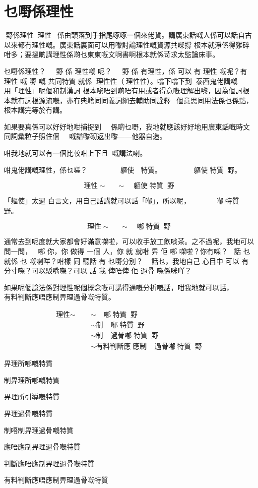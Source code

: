 \chapter{乜嘢係理性}

野係理性？理性係由頭落到手指尾啄啄一個來佬貨。講廣東話嘅人係可以話自古以來都冇理性嘅。廣東話裏面可以用嚟討論理性嘅資源共㗎撐 根本就淨係得雞碎咁多；要搵啲講理性係啲乜東東嘅文啊書啊根本就係苛求太監論床事。

乜嘢係理性？ 󱝚 野 係 理性嘅 呢？ 󱝚 野 係 有理性，係 可以 有 理性 嘅呢？有理性 嘅 嘢 嘅 共同特質 就係 理性性（理性性）。噏下噏下到󰧱泰西鬼佬講嘅，用「理性」呢個和制漢詞 根本咇唔到啲唔有用或者得意嘅理解出嚟，因為個詞根本就冇詞根源流嘅，亦冇典籍同同義詞網去輔助同詮釋個意思同用法係乜係點，根本講完等於冇講。

如果要真係可以好好地咁捕捉到係啲乜嘢，我地就應該好好地用廣東話嘅時文同詞彙粒子照住個嘅譜嚟砌返出嚟——他器自造。

咁我地就可以有一個比較咁上下且嘅講法喇。

咁鬼佬講嘅理性，係乜嗟？  󰉡  󱑡 軀使 󱝚 特質。󰀞󱗢   󰉡󱑡軀使󱝚特質野。
 
$$\text{理性}\sim \text{} \sim \text{󰉡󱑡軀使󱝚特質野}$$

「軀使」太過 白言文，用自己話講就可以話「喐」，所以呢，  󰉡󱑡喐󱝚特質野。

$$\text{理性}\sim \text{} \sim \text{󰉡󱑡喐󱝚特質野}$$

通常去到呢度就大家都會好滿意㗎啦，可以收手放工飲啖茶。之不過呢，我地可以問一問， 喐 你，你 做得 一個 人，你 就 就咁 畀 佢 喐 㗎啦？你冇㗎？ 話 乜 就係 乜 嘅喇咩？咁樣 同 聽話 有 乜嘢分別？  話乜，我地自己 心目中 可以 有 分寸㗎？可以駁嘴㗎？可以 話 我 俾唔俾 佢 過骨 㗎係咪吖？

如果呢個諗法係對理性呢個概念嘅可講得通嘅分析嘅話，咁我地就可以話，  有料判斷應唔應制畀理過骨嘅特質。

\begin{align*}
    \text{理性}\sim \text{}
      &\sim \text{󰉡󱑡喐󱝚特質野}\\
      &\sim \text{制󰉡󱑡喐󱝚特質野}\\
      &\sim \text{制󰉡󱑡過骨喐󱝚特質野}\\
      &\sim \text{有料判斷應𠄡應制󰉡󱑡過骨喐󱝚特質野}
\end{align*}


    



畀理所喐嘅特質

制畀理所喐嘅特質

畀理所引導嘅特質

畀理過骨嘅特質

制唔制畀理過骨嘅特質

應唔應制畀理過骨嘅特質

判斷應唔應制畀理過骨嘅特質

有料判斷應唔應制畀理過骨嘅特質





